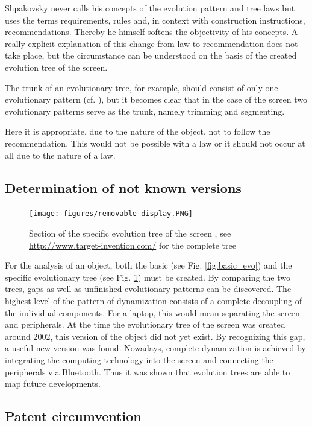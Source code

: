 \documentclass[11pt,a4paper]{article}
\begin{document}
Shpakovsky never calls his concepts of the evolution pattern and tree laws but
uses the terms requirements, rules and, in context with construction
instructions, recommendations. Thereby he himself softens the objectivity of
his concepts. A really explicit explanation of this change from law to
recommendation does not take place, but the circumstance can be understood on
the basis of the created evolution tree of the screen.

The trunk of an evolutionary tree, for example, should consist of only one
evolutionary pattern (cf. \cite[p. 122f]{Shpakovsky2016}), but it becomes
clear that in the case of the screen two evolutionary patterns serve as the
trunk, namely trimming and segmenting.

Here it is appropriate, due to the nature of the object, not to follow the
recommendation. This would not be possible with a law or it should not occur
at all due to the nature of a law.

\subsection{Determination of not known versions}

\begin{figure}[htb]
  \centering
  \texttt{[image: figures/removable display.PNG]}
  \caption{\small Section of the specific evolution tree of the screen
    \cite{Shpakovsky2016}, see \url{http://www.target-invention.com/} for the
    complete tree}
	\label{fig:spec_evo}
\end{figure}

For the analysis of an object, both the basic (see Fig. \ref{fig:basic_evo})
and the specific evolutionary tree (see Fig. \ref{fig:spec_evo}) must be
created. By comparing the two trees, gaps as well as unfinished evolutionary
patterns can be discovered. The highest level of the pattern of dynamization
consists of a complete decoupling of the individual components. For a laptop,
this would mean separating the screen and peripherals. At the time the
evolutionary tree of the screen was created around 2002, this version of the
object did not yet exist. By recognizing this gap, a useful new version was
found. Nowadays, complete dynamization is achieved by integrating the
computing technology into the screen and connecting the peripherals via
Bluetooth. Thus it was shown that evolution trees are able to map future
developments.

\subsection{Patent circumvention}
\end{document}
